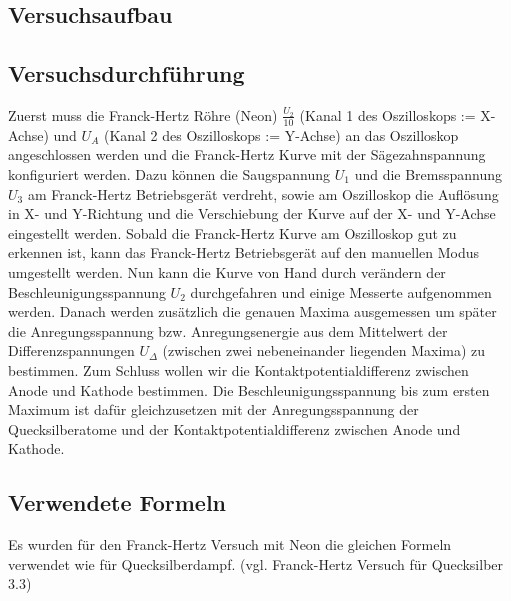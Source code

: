 \documentclass[12pt,a4paper]{article}
\begin{document}
\subsection{Versuchsaufbau}
\subsection{Versuchsdurchführung}
Zuerst muss die Franck-Hertz Röhre (Neon) $\frac{U_2}{10}$ (Kanal 1 des Oszilloskops := X-Achse) und $U_A$ (Kanal 2 des Oszilloskops := Y-Achse) an das Oszilloskop angeschlossen werden und die Franck-Hertz Kurve mit der Sägezahnspannung konfiguriert werden. Dazu können die Saugspannung $U_1$ und die Bremsspannung $U_3$ am Franck-Hertz Betriebsgerät verdreht, sowie
am Oszilloskop die Auflösung in X- und Y-Richtung und die Verschiebung der Kurve auf der X- und Y-Achse eingestellt werden.
Sobald die Franck-Hertz Kurve am Oszilloskop gut zu erkennen ist, kann das Franck-Hertz Betriebsgerät auf den manuellen Modus umgestellt werden. Nun kann die Kurve von Hand durch verändern der Beschleunigungsspannung $U_2$ durchgefahren und einige Messerte aufgenommen werden. Danach werden zusätzlich die genauen Maxima ausgemessen um später die Anregungsspannung bzw. Anregungsenergie aus dem Mittelwert der Differenzspannungen $U_{\Delta}$ (zwischen zwei nebeneinander liegenden Maxima) zu bestimmen.
Zum Schluss wollen wir die Kontaktpotentialdifferenz zwischen Anode und Kathode bestimmen.
Die Beschleunigungsspannung bis zum ersten Maximum ist dafür gleichzusetzen mit der Anregungsspannung der Quecksilberatome und der Kontaktpotentialdifferenz zwischen Anode und Kathode.
\subsection{Verwendete Formeln}
Es wurden für den Franck-Hertz Versuch mit Neon die gleichen Formeln verwendet wie für Quecksilberdampf. (vgl. Franck-Hertz Versuch für Quecksilber 3.3)
\end{document}
